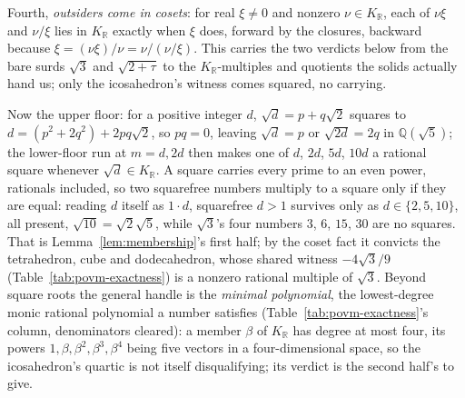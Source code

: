 \documentclass[11pt,a4paper]{article}
\newcommand{\R}{\mathbb{R}}
\newcommand{\phig}{\tau}      %
\begin{document}
Fourth, \textit{outsiders come in cosets}: for real $\xi \neq 0$ and nonzero $\nu \in K_\R$, each of $\nu\xi$ and $\nu/\xi$ lies in $K_\R$ exactly when $\xi$ does, forward by the closures, backward because $\xi = (\nu\xi)/\nu = \nu/(\nu/\xi)$. This carries the two verdicts below from the bare surds $\sqrt{3}$ and $\sqrt{2+\phig}$ to the $K_\R$-multiples and quotients the solids actually hand us; only the icosahedron's witness comes squared, no carrying.

Now the upper floor: for a positive integer $d$, $\sqrt{d} = p + q\sqrt{2}$ squares to $d = (p^2 + 2q^2) + 2pq\sqrt{2}$, so $pq = 0$, leaving $\sqrt{d} = p$ or $\sqrt{2d} = 2q$ in $\mathbb{Q}(\sqrt{5})$; the lower-floor run at $m = d, 2d$ then makes one of $d$, $2d$, $5d$, $10d$ a rational square whenever $\sqrt{d} \in K_\R$. A square carries every prime to an even power, rationals included, so two squarefree numbers multiply to a square only if they are equal: reading $d$ itself as $1 \cdot d$, squarefree $d > 1$ survives only as $d \in \{2, 5, 10\}$, all present, $\sqrt{10} = \sqrt{2}\sqrt{5}$, while $\sqrt{3}$'s four numbers $3$, $6$, $15$, $30$ are no squares. That is Lemma~\ref{lem:membership}'s first half; by the coset fact it convicts the tetrahedron, cube and dodecahedron, whose shared witness $-4\sqrt{3}/9$ (Table~\ref{tab:povm-exactness}) is a nonzero rational multiple of $\sqrt{3}$. Beyond square roots the general handle is the \textit{minimal polynomial}, the lowest-degree monic rational polynomial a number satisfies (Table~\ref{tab:povm-exactness}'s column, denominators cleared): a member $\beta$ of $K_\R$ has degree at most four, its powers $1, \beta, \beta^2, \beta^3, \beta^4$ being five vectors in a four-dimensional space, so the icosahedron's quartic is not itself disqualifying; its verdict is the second half's to give.
\end{document}
